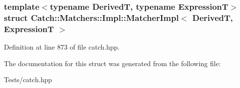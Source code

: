 \subsubsection*{template$<$typename DerivedT, typename ExpressionT$>$\newline
struct Catch\+::\+Matchers\+::\+Impl\+::\+Matcher\+Impl$<$ Derived\+T, Expression\+T $>$}



Definition at line 873 of file catch.\+hpp.



The documentation for this struct was generated from the following file\+:\begin{DoxyCompactItemize}
\item 
Tests/catch.\+hpp\end{DoxyCompactItemize}
